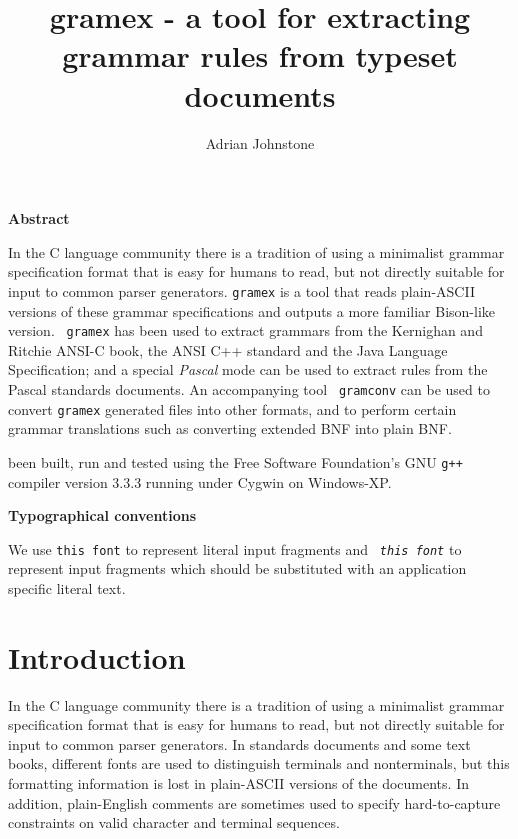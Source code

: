 \documentclass[11pt]{article}
\title{{\lt gramex} - a tool for extracting grammar rules from typeset documents}
\author{Adrian Johnstone}
\newcommand{\lp}{\tt\em}
\newcommand{\lt}{\tt}
\begin{document}
\makecstitle
\thispagestyle{empty}
\vspace*{1cm}
\begin{center}\large\bfseries\sf Abstract\end{center}
In the C language community there is a tradition of using a minimalist
grammar specification format that is easy for humans to read, but not
directly suitable for input to common parser generators. {\lt gramex}
is a tool that reads plain-ASCII versions of these grammar
specifications and outputs a more familiar Bison-like version.  {\tt
gramex} has been used to extract grammars from the Kernighan and
Ritchie ANSI-C book, the ANSI C++ standard and the Java Language
Specification; and a special {\em Pascal} mode can be used to extract
rules from the Pascal standards documents. An accompanying tool {\lt
gramconv} can be used to convert {\lt gramex} generated files into
other formats, and to perform certain grammar translations such as
converting extended BNF into plain BNF.

\vspace*{3ex}

\noindent {\lt gramex} been built, run and tested using the Free
Software Foundation's GNU {\lt g++} compiler version 3.3.3 running
under Cygwin on Windows-XP.

\vspace*{\fill}
\begin{center}\large\bfseries\sf Typographical conventions\end{center}
We use {\lt this font} to represent literal input fragments and {\lp
this font} to represent input fragments which should be substituted
with an application specific literal text.

\vspace*{\fill}
\begin{center}
\end{center}
\clearpage
\setcounter{page}{0}
\section{Introduction}

In the C language community there is a tradition of using a minimalist
grammar specification format that is easy for humans to read, but not
directly suitable for input to common parser generators.  In standards
documents and some text books, different fonts are used to distinguish
terminals and nonterminals, but this formatting information is lost in
plain-ASCII versions of the documents. In addition, plain-English
comments are sometimes used to specify hard-to-capture constraints on
valid character and terminal sequences.
\end{document}
